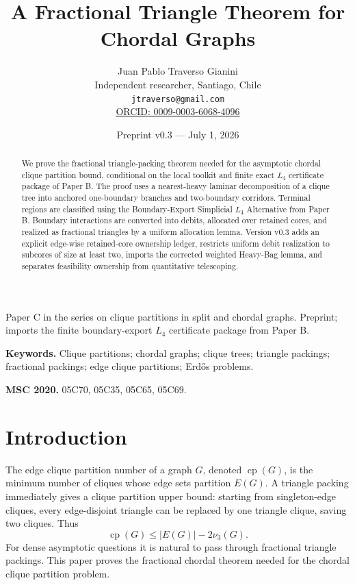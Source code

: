 \documentclass[11pt]{article}
\title{A Fractional Triangle Theorem for Chordal Graphs}
\author{
Juan Pablo Traverso Gianini\\
Independent researcher, Santiago, Chile\\
\texttt{jtraverso@gmail.com}\\
\href{https://orcid.org/0009-0003-6068-4096}{ORCID: 0009-0003-6068-4096}
}
\date{Preprint v0.3 --- July 1, 2026}
\theoremstyle{definition}
\newcommand{\cp}{\operatorname{cp}}
\begin{document}
\maketitle

\begin{center}
{\small Paper C in the series on clique partitions in split and chordal graphs. Preprint; imports the finite boundary-export \(L_4\) certificate package from Paper B.}
\end{center}

\noindent\textbf{Keywords.}
Clique partitions; chordal graphs; clique trees; triangle packings; fractional packings; edge clique partitions; Erd\H{o}s problems.

\medskip

\noindent\textbf{MSC 2020.}
05C70, 05C35, 05C65, 05C69.

\begin{abstract}
We prove the fractional triangle-packing theorem needed for the asymptotic chordal clique partition bound, conditional on the local toolkit and finite exact \(L_4\) certificate package of Paper B. The proof uses a nearest-heavy laminar decomposition of a clique tree into anchored one-boundary branches and two-boundary corridors. Terminal regions are classified using the Boundary-Export Simplicial \(L_4\) Alternative from Paper B. Boundary interactions are converted into debits, allocated over retained cores, and realized as fractional triangles by a uniform allocation lemma. Version v0.3 adds an explicit edge-wise retained-core ownership ledger, restricts uniform debit realization to subcores of size at least two, imports the corrected weighted Heavy-Bag lemma, and separates feasibility ownership from quantitative telescoping.
\end{abstract}

\tableofcontents

\section{Introduction}

The edge clique partition number of a graph \(G\), denoted \(\cp(G)\), is the minimum number of cliques whose edge sets partition \(E(G)\). A triangle packing immediately gives a clique partition upper bound: starting from singleton-edge cliques, every edge-disjoint triangle can be replaced by one triangle clique, saving two cliques. Thus
\[
    \cp(G)\le |E(G)|-2\nu_3(G).
\]
For dense asymptotic questions it is natural to pass through fractional triangle packings. This paper proves the fractional chordal theorem needed for the chordal clique partition problem.
\end{document}
